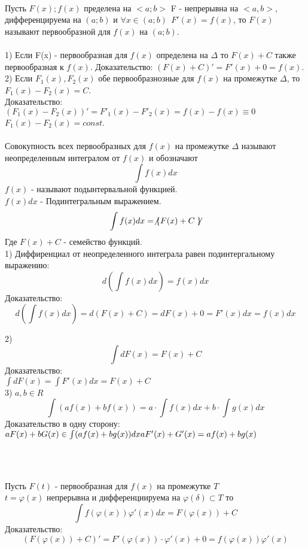 \begin{center}
\end{center}

\\
Пусть $F(x); f(x)$ пределена на $<a;b>$ F - непрерывна на $<a,b>$,
дифференцируема на $(a;b)$ и $\forall x \in (a; b) ~~ F'(x) = f(x)$, то $F(x)$
называют первообразной для $f(x)$ на $(a;b)$.\\

\\
1) Если F(x) - первообразная для $f(x)$ определена на $\Delta$ то $F(x) + C$
также первообразная к $f(x)$.
Доказательство: $(F(x) + C)' = F'(x) + 0 = f(x)$.\\

2) Если $F_{1}(x), F_{2}(x)$ обе первообразнозные для $f(x)$ на промежутке
$\Delta$, то $F_{1}(x) - F_{2}(x) = C$.\\
Доказательство: $(F_{1}(x) - F_{2}(x))' = F'_{1}(x) - F'_{2}(x) =
f(x) - f(x) \equiv 0$\\
$F_{1}(x) - F_{2}(x) = const$.\\

\\
Совокупность всех первообразных для $f(x)$ на промежутке $\Delta$ называют
неопределенным интегралом от $f(x)$ и обозначают
\[\int f(x)dx\]
$f(x)$ - называют подынтервальной функцией.\\
$f(x)dx$ - Подинтегральным выражением.
\[\int f(x)dx = \not\{ F(x) + C \not\} \]
Где $F(x) + C$ - семейство функций.\\

1) Диффиренциал от неопределенного интеграла равен подинтергальному выражению:
\[d \left ( \int f(x)dx \right ) = f(x)dx \]
Доказательство:\\
\[d \left ( \int f(x)dx \right ) = d(F(x) + C) = dF(x) + 0 = F'(x)dx = f(x)dx\]

2)\[\int dF(x) = F(x) + C\]
Доказательство:\\
$\int dF(x) = \int F'(x)dx = F(x) + C$ \\

3) $a, b \in R$\\
\[\int (af(x) + bf(x)) = a \cdot \int f(x)dx + b \cdot \int g(x)dx\]
Доказательство в одну сторону:\\
$aF(x) + bG(x) \in \int (af(x) + bg(x))dx\\
aF'(x) + G'(x) = af(x) + bg(x)$ \\

\begin{center}
  \\
\end{center}
\\
Пусть $F(t)$ - первообразная для $f(x)$ на промежутке $T$ \\
$t = \varphi (x)$ непрерывна и дифференциируема на $\varphi(\delta) \subset T$ то\\
\[\int f(\varphi (x)) \varphi'(x)dx = F(\varphi (x)) + C\]
Доказательство:
\[(F(\varphi(x)) + C)' = F'(\varphi (x)) \cdot \varphi'(x) + 0 = f(\varphi(x)) \varphi'(x)\]\\